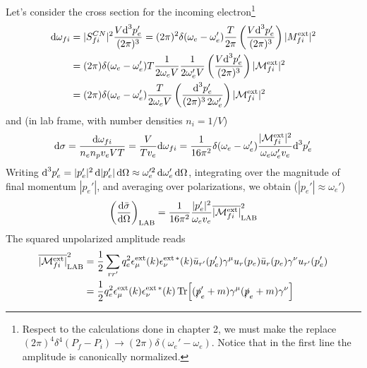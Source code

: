 \documentclass[TheoreticalPhy_ModB.tex]{subfiles}
\begin{document}
Let's consider the cross section for the incoming electron\footnote{Respect to the calculations done in chapter 2, we must make the replace $(2\pi)^4\delta^4(P_f-P_i)\rightarrow (2\pi)\delta(\omega_e'-\omega_e)$. Notice that in the first line the amplitude is canonically normalized.}
\begin{align*}
\textup{d}\omega_{fi}
&=|S_{fi}^{CN}|^2\frac{V\textup{d}^3 p_e'}{(2\pi)^3}
=(2\pi)^2\delta(\omega_e-\omega_e')\frac T{2\pi}\left(\frac{V\textup{d}^3 p_e'}{(2\pi)^3}\right)| M_{fi}^{\textup{ext}}|^2\\
&=(2\pi)\delta(\omega_e-\omega_e') T\frac1{2\omega_eV}\frac1{2\omega_e'V}\left(\frac{V\textup{d}^3 p_e'}{(2\pi)^3}\right)| \mathcal M_{fi}^{\textup{ext}}|^2\\
&=(2\pi)\delta(\omega_e-\omega_e') \frac T{2\omega_eV}\left(\frac{\textup{d}^3 p_e'}{(2\pi)^3\,2\omega_e'}\right)| \mathcal M_{fi}^{\textup{ext}}|^2
\end{align*}
and (in lab frame, with number densities $n_i=1/V$)
\[\textup{d}\sigma=\frac{\textup{d}\omega_{fi}}{n_en_pv_eVT}
=\frac{V}{Tv_e}\textup{d}\omega_{fi}
=\frac1{16\pi^2}\delta(\omega_e-\omega_e') \frac {| \mathcal M_{fi}^{\textup{ext}}|^2}{\omega_e\omega_e'v_e}\textup{d}^3 p_e'
\]
Writing $\textup{d}^3 p_e'=|p_e'|^2\,\textup{d}|p_e'|\,\textup{d}\Omega\approx\omega_e'^2\,\textup{d}\omega_e'\,\textup{d}\Omega$, integrating over the magnitude of final momentum $|p_e'|$, and averaging over polarizations, we obtain ($|p_e'|\approx\omega_e'$)
\[\left(\frac{\textup{d}\bar\sigma}{\textup{d}\Omega}\right)_{\textup{LAB}}=\frac1{16\pi^2}\frac {|p_e'|^2}{\omega_ev_e}\overline{| \mathcal M_{fi}^{\textup{ext}}|}^2_{\textup{LAB}}\]
The squared unpolarized amplitude reads
\begin{align*}
\overline{| \mathcal M_{fi}^{\textup{ext}}|}^2_{\textup{LAB}}
&=\frac12\sum_{rr'}q_e^2\epsilon_\mu^{\textup{ext}}(k)\epsilon_\nu^{\textup{ext}\,*}(k)\bar u_{r'}(p_e')\gamma^\mu u_r(p_e)\bar u_r(p_e)\gamma^\nu u_{r'}(p_e')\\
&=\frac12q_e^2\epsilon_\mu^{\textup{ext}}(k)\epsilon_\nu^{\textup{ext}\,*}(k)\Tr[(\slashed p'_e+m)\gamma^\mu(\slashed p_e+m)\gamma^\nu]
\end{align*}
\end{document}
